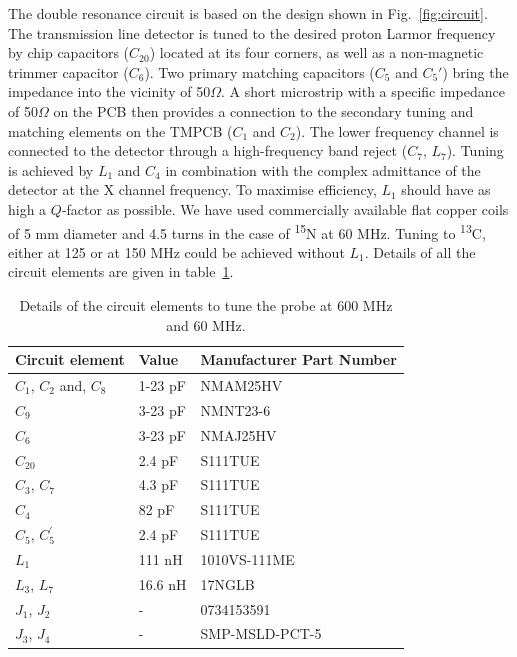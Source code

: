 \documentclass[preprint,5p]{elsarticle}
\newcommand{\fig}[1]{Fig.~\ref{#1}}
\begin{document}
\cbstart The double resonance circuit is based on the design shown in \fig{fig:circuit}.\cbend
 The transmission line detector is tuned to the desired proton
Larmor frequency by chip capacitors ($C_{20}$) located at its four corners,
as well as a non-magnetic trimmer capacitor ($C_6$). Two primary
matching capacitors ($C_5$ and $C_5'$) bring the impedance into the
vicinity of 50$\Omega$. A short microstrip
with a specific impedance of 50$\Omega$
on the PCB then provides a connection to the secondary tuning and matching elements on the TMPCB ($C_1$ and $C_2$).
The lower frequency channel is connected to the detector through a high-frequency band reject ($C_7$, $L_7$).
Tuning is achieved by $L_1$ and $C_4$ in combination with
the complex admittance of the detector at the X channel frequency.
To maximise efficiency, $L_1$ should have as high a $Q$-factor as possible. We have
used commercially available flat copper coils of 5 mm diameter and 4.5 turns in the case of
\textsuperscript{15}N at 60 MHz. Tuning to \textsuperscript{13}C, either at 125 or at 150 MHz
could be achieved without $L_1$. \cbstart Details of all the circuit elements are given in table~\ref{tab:circuit}.
\begin{table}[h]
\centering
\caption{Details of the circuit elements to tune the probe at 600 MHz and 60 MHz.}
\label{tab:circuit}
\begin{tabular}{||p{.3\linewidth}|p{.2\linewidth}|p{.3\linewidth}||}
\hline
Circuit element   & Value	&Manufacturer Part Number	\\
\hline
$C_1$, $C_2$ and, $C_8$		&1-23 pF	& NMAM25HV\\
$C_9$	&3-23 pF	& NMNT23-6\\
$C_6$	&3-23 pF	& NMAJ25HV\\
$C_{20}$  & 2.4 pF		& S111TUE\\
$C_3$, $C_7$	&4.3 pF		& S111TUE\\
$C_4$	&82 pF	& S111TUE\\
$C_5$, $C^{'}_{5}$	&2.4 pF	& S111TUE\\
$L_1$	&111 nH	& 1010VS-111ME\\
$L_3$, $L_7$	 &16.6 nH	& 17NGLB\\
$J_1$, $J_2$ & -&0734153591\\
$J_3$, $J_4$ & -&SMP-MSLD-PCT-5\\
\hline
\end{tabular}
\end{table}
\end{document}
